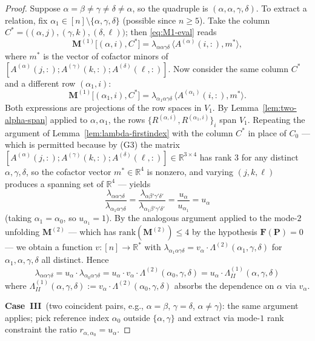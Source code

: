 \documentclass[12pt]{article}
\theoremstyle{definition}
\begin{document}
\begin{proof}
Suppose $\alpha=\beta\neq\gamma\neq\delta\neq\alpha$, so the quadruple is
$(\alpha,\alpha,\gamma,\delta)$. To extract a relation, fix $\alpha_1\in[n]\setminus\{\alpha,\gamma,\delta\}$
(possible since $n\geq 5$). Take the column $C^*=\bigl((\alpha,j),(\gamma,k),(\delta,\ell)\bigr)$;
then \eqref{eq:M1-eval} reads
\[
\mathbf{M}^{(1)}\bigl[(\alpha,i),C^*\bigr]
=\lambda_{\alpha\alpha\gamma\delta}\,\bigl\langle A^{(\alpha)}(i,:),m^*\bigr\rangle,
\]
where $m^*$ is the vector of cofactor minors of
$[A^{(\alpha)}(j,:);A^{(\gamma)}(k,:);A^{(\delta)}(\ell,:)]$. Now consider the same
column $C^*$ and a different row $(\alpha_1,i)$:
\[
\mathbf{M}^{(1)}\bigl[(\alpha_1,i),C^*\bigr]
=\lambda_{\alpha_1\alpha\gamma\delta}\,\bigl\langle A^{(\alpha_1)}(i,:),m^*\bigr\rangle.
\]
Both expressions are projections of the row spaces in $V_1$. By
Lemma~\ref{lem:two-alpha-span} applied to $\alpha,\alpha_1$, the rows
$\{R^{(\alpha,i)},R^{(\alpha_1,i)}\}_{i}$ span $V_1$. Repeating the argument of
Lemma~\ref{lem:lambda-firstindex} with the column $C^*$ in place of $C_0$ — which is
permitted because by (G3) the matrix
$[A^{(\alpha)}(j,:);A^{(\gamma)}(k,:);A^{(\delta)}(\ell,:)]\in\mathbb{R}^{3\times 4}$ has
rank $3$ for any distinct $\alpha,\gamma,\delta$, so the cofactor vector $m^*\in\mathbb{R}^4$
is nonzero, and varying $(j,k,\ell)$ produces a spanning set of $\mathbb{R}^4$ — yields
\[
\frac{\lambda_{\alpha\alpha\gamma\delta}}{\lambda_{\alpha_1\alpha\gamma\delta}}
=\frac{\lambda_{\alpha\beta'\gamma'\delta'}}{\lambda_{\alpha_1\beta'\gamma'\delta'}}
=\frac{u_\alpha}{u_{\alpha_1}}=u_\alpha
\]
(taking $\alpha_1=\alpha_0$, so $u_{\alpha_1}=1$). By the analogous argument applied to the
mode-$2$ unfolding $\mathbf{M}^{(2)}$ — which has $\mathrm{rank}(\mathbf{M}^{(2)})\leq 4$ by
the hypothesis $\mathbf{F}(\mathbf{P})=0$ — we obtain a function $v:[n]\to\mathbb{R}^*$ with
$\lambda_{\alpha_1\alpha\gamma\delta}=v_\alpha\cdot\Lambda^{(2)}(\alpha_1,\gamma,\delta)$ for
$\alpha_1,\alpha,\gamma,\delta$ all distinct. Hence
\[
\lambda_{\alpha\alpha\gamma\delta}=u_\alpha\cdot\lambda_{\alpha_0\alpha\gamma\delta}
=u_\alpha\cdot v_\alpha\cdot\Lambda^{(2)}(\alpha_0,\gamma,\delta)
=u_\alpha\cdot\Lambda^{(1)}_{II}(\alpha,\gamma,\delta)
\]
where $\Lambda^{(1)}_{II}(\alpha,\gamma,\delta):=v_\alpha\cdot\Lambda^{(2)}(\alpha_0,\gamma,\delta)$
absorbs the dependence on $\alpha$ via $v_\alpha$.

\textbf{Case~III}\, (two coincident pairs, e.g., $\alpha=\beta$, $\gamma=\delta$, $\alpha\neq\gamma$):
the same argument applies; pick reference index $\alpha_0$ outside $\{\alpha,\gamma\}$ and
extract via mode-$1$ rank constraint the ratio $r_{\alpha,\alpha_0}=u_\alpha$.


\end{proof}
\end{document}
